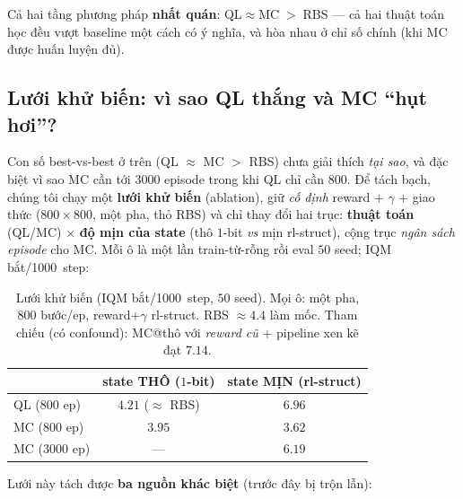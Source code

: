 \documentclass[11pt,a4paper]{article}
\newcommand{\catk}{bắt/1000}
\begin{document}
Cả hai tầng phương pháp \textbf{nhất quán}: $\text{QL} \approx \text{MC} \;>\; \text{RBS}$ ---
cả hai thuật toán học đều vượt baseline một cách có ý nghĩa, và hòa nhau ở chỉ số chính (khi MC
được huấn luyện đủ).

\subsection{Lưới khử biến: vì sao QL thắng và MC ``hụt hơi''?}\label{sec:grid}

Con số best-vs-best ở trên (QL $\approx$ MC $>$ RBS) chưa giải thích \emph{tại sao}, và đặc biệt vì
sao MC cần tới $3000$ episode trong khi QL chỉ cần $800$. Để tách bạch, chúng tôi chạy một
\textbf{lưới khử biến} (ablation), giữ \emph{cố định} reward + $\gamma$ + giao thức ($800\times 800$,
một pha, thỏ RBS) và chỉ thay đổi hai trục: \textbf{thuật toán} (QL/MC) $\times$ \textbf{độ mịn của
state} (thô $1$-bit \emph{vs} mịn rl-struct), cộng trục \emph{ngân sách episode} cho MC. Mỗi ô là một
lần train-từ-rỗng rồi eval $50$ seed; IQM \catk\ step:

\begin{table}[h]
\centering
\caption{Lưới khử biến (IQM \catk\ step, $50$ seed). Mọi ô: một pha, $800$ bước/ep, reward+$\gamma$
rl-struct. RBS $\approx 4.4$ làm mốc. Tham chiếu (có confound): MC@thô với \emph{reward cũ} +
pipeline xen kẽ đạt $7.14$.}
\label{tab:grid}
\small
\begin{tabular}{lcc}
\toprule
 & state THÔ ($1$-bit) & state MỊN (rl-struct) \\
\midrule
QL ($800$ ep)  & $4.21$ \;($\approx$ RBS) & $\mathbf{6.96}$ \\
MC ($800$ ep)  & $3.95$ & $3.62$ \\
MC ($3000$ ep) & --- & $6.19$ \\
\bottomrule
\end{tabular}
\end{table}

\noindent Lưới này tách được \textbf{ba nguồn khác biệt} (trước đây bị trộn lẫn):
\end{document}
